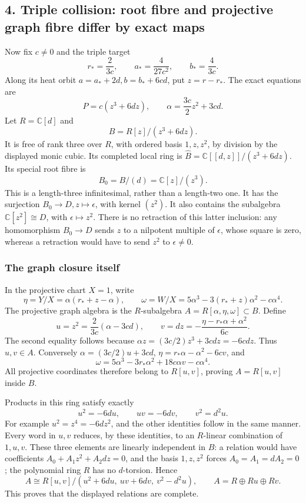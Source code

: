 \documentclass[
  10pt,
  a4paper,
]{article}
\begin{document}
\subsection{4. Triple collision: root fibre and projective graph fibre
differ by exact
maps}\label{triple-collision-root-fibre-and-projective-graph-fibre-differ-by-exact-maps}

Now fix \(c\ne0\) and the triple target \[
r_* =\frac{2}{3c},\qquad
a_* =\frac{4}{27c^2},\qquad b_* =\frac4{3c}.
\tag{EFI21}
\] Along its heat orbit \(a=a_*+2d, b=b_*+6cd\), put \(z=r-r_*\). The
exact equations are \[
P=c(z^3+6dz),\qquad
\alpha=\frac{3c}{2}z^2+3cd.
\tag{EFI22}
\] Let \(R=\mathbb C[d]\) and \[
B=R[z]/(z^3+6dz).
\tag{EFI23}
\] It is free of rank three over \(R\), with ordered basis \(1,z,z^2\),
by division by the displayed monic cubic. Its completed local ring is
\(\widehat B=\mathbb C[[d,z]]/(z^3+6dz)\). Its special root fibre is \[
B_0=B/(d)=\mathbb C[z]/(z^3).
\tag{EFI24}
\] This is a length-three infinitesimal, rather than a length-two one.
It has the surjection \(B_0\to D, z\mapsto\epsilon\), with kernel
\((z^2)\). It also contains the subalgebra \(\mathbb C[z^2]\cong D\),
with \(\epsilon\mapsto z^2\). There is no retraction of this latter
inclusion: any homomorphism \(B_0\to D\) sends \(z\) to a nilpotent
multiple of \(\epsilon\), whose square is zero, whereas a retraction
would have to send \(z^2\) to \(\epsilon\ne0\).

\subsubsection{The graph closure itself}\label{the-graph-closure-itself}

In the projective chart \(X=1\), write \[
\eta=Y/X=\alpha(r_*+z-\alpha),\qquad
\omega=W/X=5\alpha^3-3(r_*+z)\alpha^2-c\alpha^4.
\tag{EFI25}
\] The projective graph algebra is the \(R\)-subalgebra
\(A=R[\alpha,\eta,\omega]\subset B\). Define \[
u=z^2=\frac{2}{3c}(\alpha-3cd),
\qquad
v=dz=-\frac{\eta-r_*\alpha+\alpha^2}{6c}.
\tag{EFI26}
\] The second equality follows because
\(\alpha z=(3c/2)z^3+3cdz=-6cdz\). Thus \(u,v\in A\). Conversely
\(\alpha=(3c/2)u+3cd\), \(\eta=r_*\alpha-\alpha^2-6cv\), and \[
\omega=5\alpha^3-3r_*\alpha^2+18c\alpha v-c\alpha^4.
\tag{EFI27}
\] All projective coordinates therefore belong to \(R[u,v]\), proving
\(A=R[u,v]\) inside \(B\).

Products in this ring satisfy exactly \[
u^2=-6du,\qquad uv=-6dv,\qquad v^2=d^2u.
\tag{EFI28}
\] For example \(u^2=z^4=-6dz^2\), and the other identities follow in
the same manner. Every word in \(u,v\) reduces, by these identities, to
an \(R\)-linear combination of \(1,u,v\). These three elements are
linearly independent in \(B\): a relation would have coefficients
\(A_0+A_1z^2+A_2dz=0\), and the basis \(1,z,z^2\) forces
\(A_0=A_1=dA_2=0\); the polynomial ring \(R\) has no \(d\)-torsion.
Hence \[
A\cong
R[u,v]/(u^2+6du,\ uv+6dv,\ v^2-d^2u),
\qquad A=R\oplus Ru\oplus Rv.
\tag{EFI29}
\] This proves that the displayed relations are complete.
\end{document}
